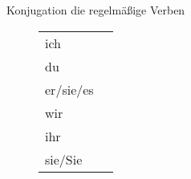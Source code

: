 \begin{syntax}{Konjugation die regelmäßige Verben}{}
\begin{figure}[H]
\centering
\begin{tabular}{ll}
	ich & \ws{e} \\
	du & \ws{st} \\
	er/sie/es & \ws{t} \\
	wir & \ws{en} \\
	ihr & \ws{t} \\
	sie/Sie & \ws{en}
\end{tabular}
\end{figure}
\end{syntax}
